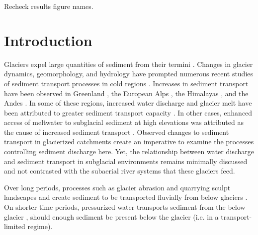 \documentclass[11pt]{article}
\begin{document}
% 
% 


Recheck results figure names.

\section{Introduction}
\label{sect:intro}


Glaciers expel large quantities of sediment from their termini \citep{hallet1996}.
Changes in glacier dynamics, geomorphology, and hydrology  have prompted numerous  recent studies of  sediment transport processes in cold regions \citep[e.g.][]{zhang2022}.
Increases in sediment transport  have been observed in Greenland \citep{bendixen2017}, the European Alps \citep{costa2017}, the Himalayas \citep{li2021}, and the Andes \citep{vergara2022}.
In some of these regions, increased water discharge and glacier melt have been attributed to greater sediment transport capacity \citep{bendixen2017,costa2017,li2021}.
In other cases, enhanced access of meltwater to subglacial sediment at high elevations was attributed as the cause of increased sediment transport \citep{delaney2020,vergara2022}.
Observed changes to sediment transport in glacierized catchments create an imperative to examine the processes controlling sediment discharge here. 
Yet, the relationship between water discharge and sediment transport in subglacial environments remains minimally discussed and not contrasted with the subaerial river systems that these glaciers feed.

Over long periods, processes such as glacier abrasion and quarrying sculpt landscapes and create sediment to be transported fluvially from below glaciers \citep[c.f.][]{hallet1979,iverson2012,ugelvig2018}. 
On shorter time periods, pressurized water transports sediment from the below glacier \citep{walder1994,creyts2013,beaud2018}, should enough sediment be present below the glacier (i.e. in a transport-limited regime).
\end{document}
